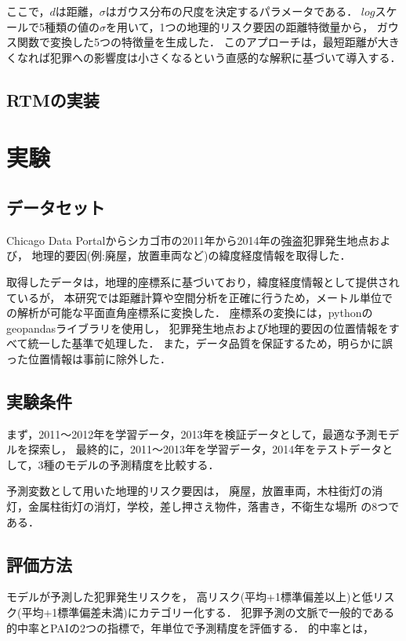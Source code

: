 \documentclass[12pt,a4paper,oneside]{jsbook}
\theoremstyle{plain}
\begin{document}
ここで，$d$は距離，$\sigma$はガウス分布の尺度を決定するパラメータである．
$log$スケールで5種類の値の$\sigma$を用いて，1つの地理的リスク要因の距離特徴量から，
ガウス関数で変換した5つの特徴量を生成した．
このアプローチは，最短距離が大きくなれば犯罪への影響度は小さくなるという直感的な解釈に基づいて導入する．

\section{RTMの実装}
\chapter{実験}
\label{chapter_4}
\section{データセット}
Chicago Data Portalからシカゴ市の2011年から2014年の強盗犯罪発生地点および，
地理的要因(例:廃屋，放置車両など)の緯度経度情報を取得した．

取得したデータは，地理的座標系に基づいており，緯度経度情報として提供されているが，
本研究では距離計算や空間分析を正確に行うため，メートル単位での解析が可能な平面直角座標系に変換した．
座標系の変換には，pythonのgeopandasライブラリを使用し，
犯罪発生地点および地理的要因の位置情報をすべて統一した基準で処理した．
また，データ品質を保証するため，明らかに誤った位置情報は事前に除外した．
\section{実験条件}
まず，2011〜2012年を学習データ，2013年を検証データとして，最適な予測モデルを探索し，
最終的に，2011〜2013年を学習データ，2014年をテストデータとして，3種のモデルの予測精度を比較する．

予測変数として用いた地理的リスク要因は，
廃屋，放置車両，木柱街灯の消灯，金属柱街灯の消灯，学校，差し押さえ物件，落書き，不衛生な場所
の8つである．
\section{評価方法}
モデルが予測した犯罪発生リスクを，
高リスク(平均+1標準偏差以上)と低リスク(平均+1標準偏差未満)にカテゴリー化する．
犯罪予測の文脈で一般的である的中率とPAIの2つの指標で，年単位で予測精度を評価する．
的中率とは，
\end{document}
